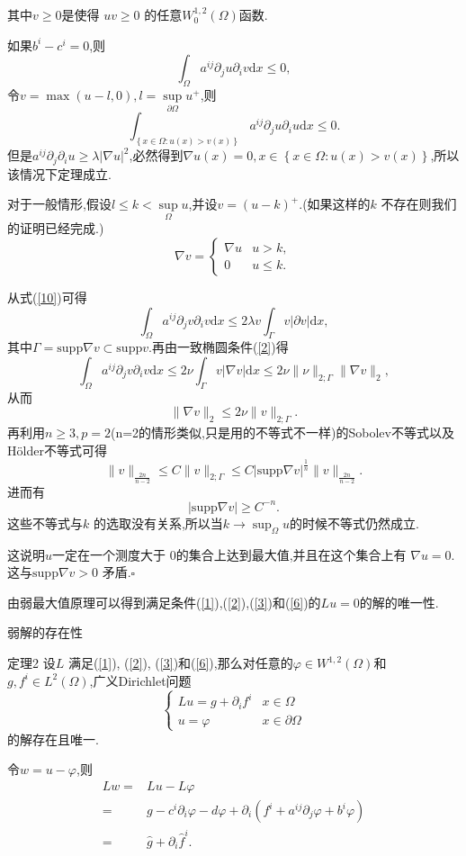 \begin{frame}[t]
其中$v\ge 0$是使得 $uv\ge 0$ 的任意$W^{1,2}_0(\Omega)$函数.

如果$b^{i}-c^{i}=0$,则
\[
\int_{\Omega}a^{ij}\partial_ju\partial_i v \mathrm{d}x\le 0,
\] 
令$v=\max\left( u-l,0 \right),l =\sup\limits_{\partial\Omega}u^{+} $,则
\[
  \int_{\left\{x\in \Omega:u(x)>v(x)\right\} }a^{ij}\partial_ju\partial_i u\mathrm{d}x\le 0.
\] 
但是$a^{ij}\partial_j\partial_i u\ge \lambda |\nabla u|^2$,必然得到$\nabla u(x)=0,x\in \left\{ x\in \Omega:u(x)>v(x) \right\} $,所以该情况下定理成立.

对于一般情形,假设$l\le k <\sup\limits_{\Omega}u$,并设$v=(u-k)^{+}$.(如果这样的$k$ 不存在则我们的证明已经完成.)
\[
\nabla v=\left\{
  \begin{matrix} \nabla u & u>k,\\
  0 &u\le k.\end{matrix} 
\right.
\]
\end{frame}
\begin{frame}[t]
  从式(\ref{10})可得
  \[
  \int_{\Omega}a^{ij}\partial_j v\partial_iv \mathrm{d}x\le 2\lambda v\int_{\Gamma}v|\partial v|\mathrm{d}x,
  \] 
  其中$\Gamma=\mathrm{supp}\nabla v \subset \mathrm{supp}v$.再由一致椭圆条件(\ref{2})得
  \[
  \int_{\Omega}a^{ij}\partial_jv\partial_iv\mathrm{d}x\le 2 \nu \int_{\Gamma}v|\nabla v|\mathrm{d}x\le 2\nu \|\nu\|_{2;\Gamma}\|\nabla v\|_{2},
  \] 
  从而
  \[
  \|\nabla v\|_2\le 2\nu \|v\|_{2;\Gamma}.
  \]
  再利用$n\ge 3,p=2$(n=2的情形类似,只是用的不等式不一样)的Sobolev不等式以及H\"{o}lder不等式可得
  \[
    \|v\|_{\frac{2n}{n-2}}\le C\|v\|_{2;\Gamma}\le C|\mathrm{supp}\nabla v|^{\frac{1}{n}}\|v\|_{\frac{2n}{n-2}}
  .\]
  进而有
  \[
  |\mathrm{supp}\nabla v|\ge C^{-n}.
  \] 
这些不等式与$k$ 的选取没有关系,所以当$k\to \sup_{\Omega}u$的时候不等式仍然成立.
\end{frame}
\begin{frame}[t]
这说明$u$一定在一个测度大于 $0$的集合上达到最大值,并且在这个集合上有 $\nabla u=0$.这与$\mathrm{supp}\nabla v> 0$ 矛盾.\hfill $\square $\par

由弱最大值原理可以得到满足条件(\ref{1}),(\ref{2}),(\ref{3})和(\ref{6})的$Lu=0$的解的唯一性.
\end{frame}
\begin{frame}[t]{弱解的存在性}
  \begin{alertblock}{定理2}
    设$L$ 满足(\ref{1}), (\ref{2}), (\ref{3})和(\ref{6}),那么对任意的$\varphi \in W^{1,2}(\Omega)$和$g,f^{i}\in L^2(\Omega)$,广义Dirichlet问题\[
    \left\{ \begin{matrix} 
	Lu=g+\partial_i f^{i} & x\in \Omega\\
	u=\varphi & x\in \partial \Omega
      \end{matrix} \right.
    \] 
    的解存在且唯一.
   \end{alertblock}
   令$w=u-\varphi$,则
   \begin{align*}
     Lw=& Lu-L\varphi\\
     =& g-c^{i}\partial_i \varphi-d\varphi+\partial_i(f^{i}+a^{ij}\partial_j\varphi+b^{i}\varphi)\\
     =& \widehat{g}+\partial_i \widehat{f}^{i} 
   .\end{align*}
 \end{frame}
